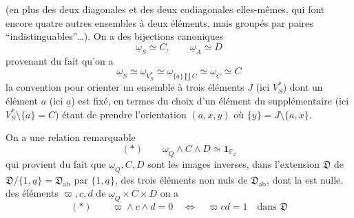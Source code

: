 (en plus des deux diagonales et des deux codiagonales elles-mêmes,
qui font encore quatre autres ensembles à deux éléments, mais groupés par
paires ``indistinguables''\ldots).
On a des bijections canoniques
\[
 \underline{\omega}_S\simeq C,\qquad \underline{\omega}_A\simeq D
\]
provenant du fait qu'on a
\[
 \underline{\omega}_S\simeq\underline{\omega}_{V_S^*}
 \simeq\underline{\omega}_{\{a\}\amalg C}
 \simeq\underline{\omega}_C\simeq C
\]
la convention pour orienter un ensemble à trois éléments $J$ (ici $V_S^*$)
dont un élément $a$ (ici $\underline{a}$) est fixé, en termes du choix d'un
élément  du supplémentaire (ici $V_S^*\setminus\{a\}=C$)
étant de prendre l'orientation $(a,x,y)$
où $\{y\}=J\setminus\{a,x\}$.

On a une relation remarquable
\[
(*)\qquad \underline{\omega}_Q\wedge C\wedge D\simeq\mathbf{1}_{\mathbb{F}_2}
\]
qui provient du fait que
$\underline{\omega}_Q,C,D$ sont les images inverses,
dans l'extension $\mathfrak{D}$ de
$\mathfrak{D}/\{1,\underline{a}\}=\mathfrak{D}_{\mathrm{ab}}$
par $\{1,\underline{a}\}$, des trois éléments non nuls de
$\mathfrak{D}_{\mathrm{ab}}$, dont la
 est nulle.
 des éléments $\varpi,c,d$ de
$\underline{\omega}_Q\times C\times D$  on a
\[
(*)\qquad
 \varpi\wedge c\wedge d=0
 \quad\Longleftrightarrow\quad
 \varpi c d=1\quad\text{dans }\mathfrak{D}
\]
\margin{[Attention, cette relation serait inversée si on faisait une
transposition dans l'ordre des facteurs --- il y a donc
\deleted{\unsure{une}} dans \deleted{\unsure{ce}} le choix de l'iso.
\unsure{ici} une question de convention.}

